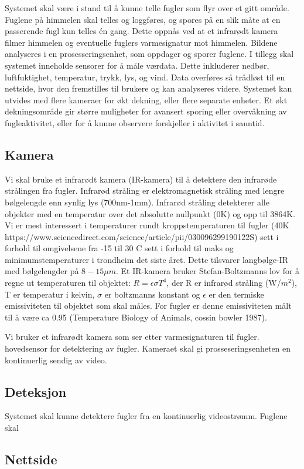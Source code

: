 Systemet skal være i stand til å kunne telle fugler som flyr over et gitt område. Fuglene på himmelen skal telles og loggføres, og spores på en slik måte at en passerende fugl kun telles én gang. Dette oppnås ved at et infrarødt kamera filmer himmelen og eventuelle fuglers varmesignatur mot himmelen. Bildene analyseres i en prosesseringsenhet, som oppdager og sporer fuglene. I tillegg skal systemet inneholde sensorer for å måle værdata. Dette inkluderer nedbør, luftfuktighet, temperatur, trykk, lys, og vind. Data overføres så trådløst til en nettside, hvor den fremstilles til brukere og kan analyseres videre. Systemet kan utvides med flere kameraer for økt dekning, eller flere separate enheter. Et økt dekningsområde gir større muligheter for avansert sporing eller overvåkning av fugleaktivitet, eller for å kunne observere forskjeller i aktivitet i sanntid.




\subsection{Kamera}

Vi skal bruke et infrarødt kamera (IR-kamera) til å detektere den infrarøde strålingen fra fugler. Infrarød stråling er elektromagnetisk stråling med lengre bølgelengde enn synlig lys (700nm-1mm). Infrarød stråling detekterer alle objekter med en temperatur over det absolutte nullpunkt (0K) og opp til 3864K. Vi er mest interessert i temperaturer rundt kroppstemperaturen til fugler (40K https://www.sciencedirect.com/science/article/pii/030096299190122S) sett i forhold til omgivelsene fra -15 til 30 C sett i forhold til maks og minimumstemperaturer i trondheim det siste året. Dette tilsvarer langbølge-IR med bølgelengder på $8-15\mu m$. Et IR-kamera bruker Stefan-Boltzmanns lov for å regne ut temperaturen til objektet: $R=\epsilon \sigma T^4$, der R er infrarød stråling (W/$m^2$), T er temperatur i kelvin, $\sigma$ er boltzmanns konstant og $\epsilon$ er den termiske emissiviteten til objektet som skal måles. For fugler er denne emissiviteten målt til å være ca 0.95 (Temperature Biology
of Animals, cossin bowler 1987). 


Vi bruker et infrarødt kamera som ser etter varmesignaturen til fugler. hovedsensor for detektering av fugler. Kameraet skal gi prosseseringsenheten en kontinuerlig sendig av video.


\subsection{Deteksjon}
Systemet skal kunne detektere fugler fra en kontinuerlig videostrømm. Fuglene skal 



\subsection{Nettside}



